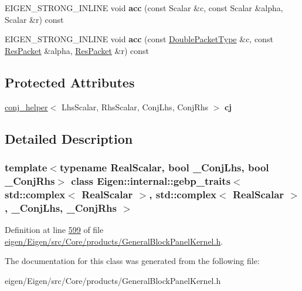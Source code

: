 \begin{DoxyCompactItemize}
E\+I\+G\+E\+N\+\_\+\+S\+T\+R\+O\+N\+G\+\_\+\+I\+N\+L\+I\+NE void {\bfseries acc} (const Scalar \&c, const Scalar \&alpha, Scalar \&r) const
\item 
\mbox{\label{class_eigen_1_1internal_1_1gebp__traits_3_01std_1_1complex_3_01_real_scalar_01_4_00_01std_1_1com3fbe501975c876a010def81ad2701521_a6ee150d8ddc491faf9f1fa5f0f8b2708}} 
E\+I\+G\+E\+N\+\_\+\+S\+T\+R\+O\+N\+G\+\_\+\+I\+N\+L\+I\+NE void {\bfseries acc} (const \hyperlink{struct_eigen_1_1internal_1_1_double_packet}{Double\+Packet\+Type} \&c, const \hyperlink{class_eigen_1_1internal_1_1_tensor_lazy_evaluator_writable}{Res\+Packet} \&alpha, \hyperlink{class_eigen_1_1internal_1_1_tensor_lazy_evaluator_writable}{Res\+Packet} \&r) const
\end{DoxyCompactItemize}
\subsection*{Protected Attributes}
\begin{DoxyCompactItemize}
\item 
\mbox{\label{class_eigen_1_1internal_1_1gebp__traits_3_01std_1_1complex_3_01_real_scalar_01_4_00_01std_1_1com3fbe501975c876a010def81ad2701521_a3bdfc1124b0b054f436314f6a81569f4}} 
\hyperlink{struct_eigen_1_1internal_1_1conj__helper}{conj\+\_\+helper}$<$ Lhs\+Scalar, Rhs\+Scalar, Conj\+Lhs, Conj\+Rhs $>$ {\bfseries cj}
\end{DoxyCompactItemize}


\subsection{Detailed Description}
\subsubsection*{template$<$typename Real\+Scalar, bool \+\_\+\+Conj\+Lhs, bool \+\_\+\+Conj\+Rhs$>$\newline
class Eigen\+::internal\+::gebp\+\_\+traits$<$ std\+::complex$<$ Real\+Scalar $>$, std\+::complex$<$ Real\+Scalar $>$, \+\_\+\+Conj\+Lhs, \+\_\+\+Conj\+Rhs $>$}



Definition at line \hyperlink{eigen_2_eigen_2src_2_core_2products_2_general_block_panel_kernel_8h_source_l00599}{599} of file \hyperlink{eigen_2_eigen_2src_2_core_2products_2_general_block_panel_kernel_8h_source}{eigen/\+Eigen/src/\+Core/products/\+General\+Block\+Panel\+Kernel.\+h}.



The documentation for this class was generated from the following file\+:\begin{DoxyCompactItemize}
\item 
eigen/\+Eigen/src/\+Core/products/\+General\+Block\+Panel\+Kernel.\+h\end{DoxyCompactItemize}
